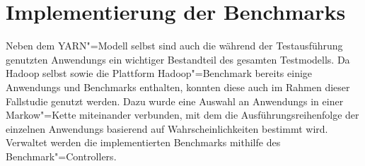 \chapter{Implementierung der Benchmarks}
\label{ch:benchmarks}

Neben dem \gls{YARN}"=Modell selbst sind auch die während der Testausführung genutzten \glspl{Anwendung} ein wichtiger Bestandteil des gesamten Testmodells.
Da Hadoop selbst sowie die Plattform Hadoop"=Benchmark bereits einige \glspl{Anwendung} und Benchmarks enthalten, konnten diese auch im Rahmen dieser Fallstudie genutzt werden.
Dazu wurde eine Auswahl an \glspl{Anwendung} in einer Markow"=Kette miteinander verbunden, mit dem die Ausführungsreihenfolge der einzelnen \glspl{Anwendung} basierend auf Wahrscheinlichkeiten bestimmt wird.
Verwaltet werden die implementierten Benchmarks mithilfe des Benchmark"=Controllers.






